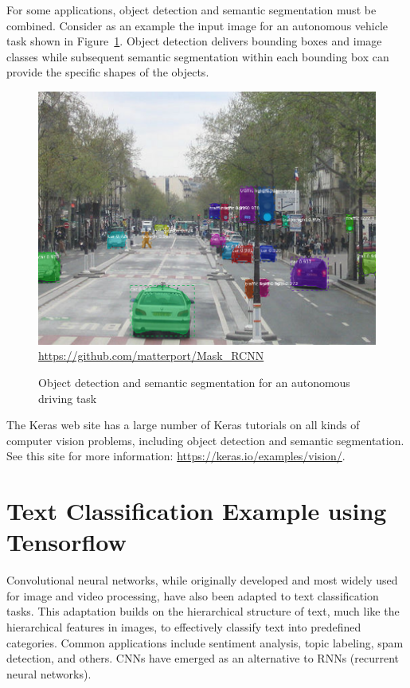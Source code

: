 For some applications, object detection and semantic segmentation must be combined. Consider as an example the input image for an autonomous vehicle task shown in Figure~\ref{fig:street}. Object detection delivers bounding boxes and image classes while subsequent semantic segmentation within each bounding box can provide the specific shapes of the objects.

\begin{figure}
\centering
\includegraphics[width=.5\textwidth]{street.png} \\

\scriptsize \url{https://github.com/matterport/Mask_RCNN}
\caption[Object detection and semantic segmentation example]{Object detection and semantic segmentation for an autonomous driving task}
\label{fig:street}
\end{figure}

\begin{tcolorbox}[colback=code]
The Keras web site has a large number of Keras tutorials on all kinds of computer vision problems, including object detection and semantic segmentation. See this site for more information: \footnotesize\url{https://keras.io/examples/vision/}\normalsize.
\end{tcolorbox}

\section{Text Classification Example using Tensorflow}

Convolutional neural networks, while originally developed and most widely used for image and video processing, have also been adapted to text classification tasks. This adaptation builds on the hierarchical structure of text, much like the hierarchical features in images, to effectively classify text into predefined categories. Common applications include sentiment analysis, topic labeling, spam detection, and others. CNNs have emerged as an alternative to RNNs (recurrent neural networks).

